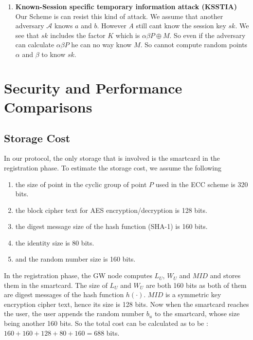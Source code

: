 \documentclass[a4paper,12pt]{report}
\begin{document}
\begin{enumerate}
\item \textbf{Known-Session specific temporary information attack (KSSTIA)}
Our Scheme is can resist this kind of attack. We assume that another
adversary $\mathcal{A}$ knows $a$ and $b$. However \textit{A} still
cant know the session key $sk$. We see that $sk$ includes the factor
$K$ which is $\alpha \beta P \oplus M$. So even if the adversary can
calculate $\alpha \beta P$ he can no way know $M$. So cannot compute
random points $\alpha$ and $\beta$ to know $sk$.
\end{enumerate}

\section{Security and Performance Comparisons}
\subsection{Storage Cost}
In our protocol, the only storage that is involved is the smartcard
in the registration phase. To estimate the storage cost, we assume
the following

\begin{enumerate}
\item the size of point in the cyclic group of point $P$ used in the ECC scheme is 320 bits.
\item the block cipher text for AES encryption/decryption is 128 bits.
\item the digest message size of the hash function (SHA-1) is 160 bits.
\item the identity size is 80 bits.
\item and the random number size is 160 bits.
\end{enumerate}

In the registration phase, the GW node computes $L_U$, $W_U$ and
$MID$ and stores them in the smartcard. The size of $L_U$ and $W_U$
are both 160 bits as both of them are digest messages of the hash
function $h(\cdot)$. $MID$ is a symmetric key encryption cipher
text, hence its size is 128 bits. Now when the smartcard reaches the
user, the user appends the random number $b_u$ to the smartcard,
whose size being another 160 bits. So the total cost can be
calculated as to be : $ 160 + 160 +128 + 80 +160 = 688 $ bits.

\begin{table}[h]
\caption{Smartcard storage cost Comparisons of proposed scheme with
other schemes} \centering {}
\end{table}
\end{document}
